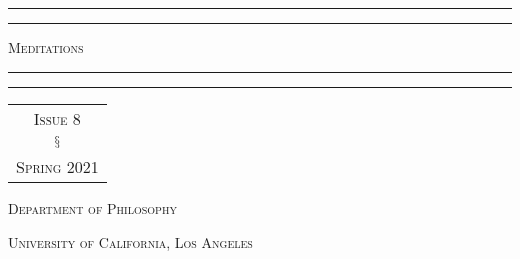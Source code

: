 \begin{titlepage} %

	\centering %
	
	\vspace*{\baselineskip} %
	
	
	\rule{\textwidth}{1.6pt}\vspace*{-\baselineskip}\vspace*{2pt} %
	\rule{\textwidth}{0.4pt} %
	
	\vspace{1\baselineskip} %
	
	{\HUGE \scshape{}\selectfont Meditations} %
	
	\vspace{0.5\baselineskip} %
	
	\rule{\textwidth}{0.4pt}\vspace*{-\baselineskip}\vspace{3.2pt} %
	\rule{\textwidth}{1.6pt} %
	
	\vspace{3\baselineskip} %
	
	
	{\LARGE 
		\selectfont 
		\begin{tabular}{c}
		\textsc{Issue 8}
		\vspace{0.75em}
		 \\
		$\mathsection$ 
		\vspace{0.75em}
		\\
	 	\textsc{Spring} 2021
	 	\end{tabular}
	 }
	
	
	\vspace*{3\baselineskip} %
	
	
	\vfill %
	
	
	{\scshape\LARGE Department of Philosophy}
	
	\vspace{0.5\baselineskip} 
	
	{\scshape\large University of California, Los Angeles}

\end{titlepage}

